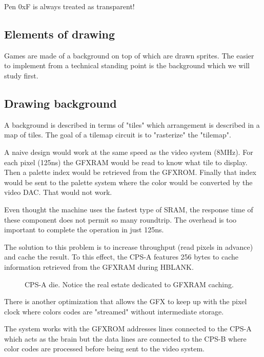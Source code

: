  \begin{trivia}
 Pen 0xF is always treated as transparent!
 \end{trivia}



\subsection{Elements of drawing}

Games are made of a background on top of which are drawn sprites. The easier to implement from a technical standing point is the background which we will study first.

\subsection{Drawing background}

A background is described in terms of "tiles" which arrangement is described in a map of tiles. The goal of a tilemap circuit is to "rasterize" the "tilemap".

A naive design would work at the same speed as the video system (8MHz). For each pixel (125ns) the GFXRAM would be read to know what tile to display. Then a palette index would be retrieved from the GFXROM. Finally that index would be sent to the palette system where the color would be converted by the video DAC. That would not work.

Even thought the machine uses the fastest type of SRAM, the response time of these component does not permit so many roundtrip. The overhead is too important to complete the operation in just 125ns.

The solution to this problem is to increase throughput (read pixels in advance) and cache the result. To this effect, the CPS-A features 256 bytes to cache information retrieved from the GFXRAM during HBLANK.

 \begin{figure}[H]%
 \caption*{CPS-A die. Notice the real estate dedicated to GFXRAM caching.}%
 \end{figure}%



There is another optimization that allows the GFX to keep up with the pixel clock where colors codes are "streamed" without intermediate storage. 

The system works with the GFXROM addresses lines connected to the CPS-A which acts as the brain but the data lines are connected to the CPS-B where color codes are processed before being sent to the video system.

